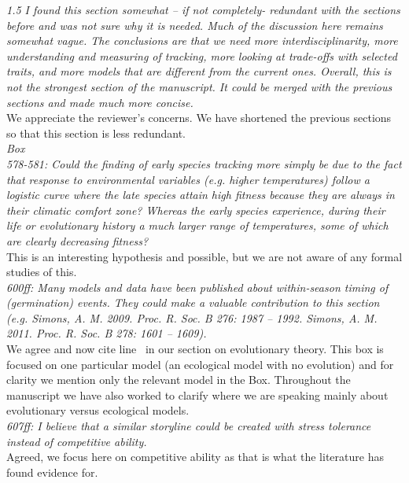 \documentclass[11pt]{article}
\newcommand{\lr}[1]{line~\lineref{#1}}
\begin{document}
\emph{1.5 I found this section somewhat – if not completely- redundant with the sections before and
was not sure why it is needed. Much of the discussion here remains somewhat vague. The
conclusions are that we need more interdisciplinarity, more understanding and measuring of
tracking, more looking at trade-offs with selected traits, and more models that are different
from the current ones. Overall, this is not the strongest section of the manuscript. It could
be merged with the previous sections and made much more concise.}\\

We appreciate the reviewer's concerns. We have shortened the previous sections so that this section is less redundant.\\

\emph{Box\\
578-581: Could the finding of early species tracking more simply be due to the fact that
response to environmental variables (e.g. higher temperatures) follow a logistic curve where
the late species attain high fitness because they are always in their climatic comfort zone?
Whereas the early species experience, during their life or evolutionary history a much larger
range of temperatures, some of which are clearly decreasing fitness?}\\

This is an interesting hypothesis and possible, but we are not aware of any formal studies of this.\\

\emph{600ff: Many models and data have been published about within-season timing of (germination)
events. They could make a valuable contribution to this section (e.g. Simons, A. M. 2009.
Proc. R. Soc. B 276: 1987 – 1992. Simons, A. M. 2011. Proc. R. Soc. B 278: 1601 – 1609).}\\

We agree and now cite \lr{simonsref1} in our section on evolutionary theory. This box is focused on one particular model (an ecological model with no evolution) and for clarity we mention only the relevant model in the Box. Throughout the manuscript we have also worked to clarify where we are speaking mainly about evolutionary versus ecological models. \\

\emph{607ff: I believe that a similar storyline could be created with stress tolerance instead of
competitive ability.}\\

Agreed, we focus here on competitive ability as that is what the literature has found evidence for.\\
\end{document}
